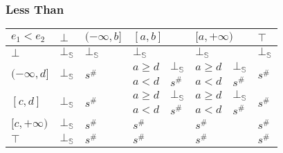 \documentclass{beamer}
\begin{document}
        \begin{frame}
            \frametitle{Less Than}
    \begin{table}[]
        \begin{tabular}{|l|l|l|ll|ll|l|}
        \hline
        $e_1 < e_2$                     & $\bot$                  & $(-\infty, b]$          & \multicolumn{2}{l|}{$[a, b]$} & \multicolumn{2}{l|}{$[a, +\infty)$} & $\top$                  \\ \hline
        $\bot$                          & $\bot_\mathbb{S}$                  & $\bot_\mathbb{S}$                  & \multicolumn{2}{l|}{$\bot_\mathbb{S}$}   & \multicolumn{2}{l|}{$\bot_\mathbb{S}$}         & $\bot_\mathbb{S}$                  \\ \hline
        \multirow{2}{*}{$(-\infty, d]$} & \multirow{2}{*}{$\bot_\mathbb{S}$} & \multirow{2}{*}{$s^\#$} & $a \ge d$       & $\bot_\mathbb{S}$      & $a \ge d$          & $\bot_\mathbb{S}$         & \multirow{2}{*}{$s^\#$} \\
                                        &                         &                         & $a < d$         & $s^\#$      & $a < d$            & $s^\#$         &                         \\ \hline
        \multirow{2}{*}{$[c, d]$}       & \multirow{2}{*}{$\bot_\mathbb{S}$} & \multirow{2}{*}{$s^\#$} & $a \ge d$       & $\bot_\mathbb{S}$      & $a \ge d$          & $\bot_\mathbb{S}$         & \multirow{2}{*}{$s^\#$} \\
                                        &                         &                         & $a < d$         & $s^\#$      & $a < d$            & $s^\#$         &                         \\ \hline
        $[c, +\infty)$                  & $\bot_\mathbb{S}$                  & $s^\#$                  & \multicolumn{2}{l|}{$s^\#$}   & \multicolumn{2}{l|}{$s^\#$}         & $s^\#$                  \\ \hline
        $\top$                          & $\bot_\mathbb{S}$                  & $s^\#$                  & \multicolumn{2}{l|}{$s^\#$}   & \multicolumn{2}{l|}{$s^\#$}         & $s^\#$                  \\ \hline
        \end{tabular}
        \end{table}
    \end{frame}
    
\end{document}
